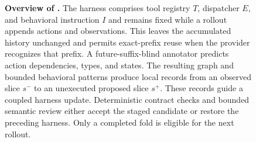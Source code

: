 \begin{figure}[t]
\caption{\textbf{Overview of \sys{}.} The harness comprises tool registry $T$,
dispatcher $E$, and behavioral instruction $I$ and remains fixed while a
rollout appends actions and observations. This leaves the accumulated history
unchanged and permits exact-prefix reuse when the provider recognizes that
prefix. A future-suffix-blind annotator
predicts action dependencies, types, and states. The resulting graph and
bounded behavioral patterns produce local records from an observed slice
$s^{-}$ to an unexecuted proposed slice $s^{+}$. These records guide a coupled
harness update. Deterministic contract checks and bounded semantic review
either accept the staged candidate or restore the preceding harness. Only a
completed fold is eligible for the next rollout.}
\label{fig:overview}
\end{figure}
